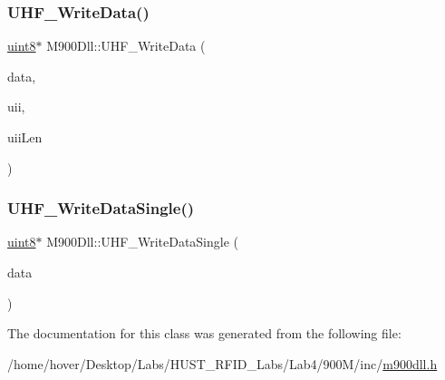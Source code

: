 \mbox{\label{class_m900_dll_adcb28ef71c880bcdca8fb0d17a1aa77e}} 
\subsubsection{\texorpdfstring{UHF\_WriteData()}{UHF\_WriteData()}}
{\footnotesize\ttfamily \mbox{\hyperlink{m900dll_8h_adde6aaee8457bee49c2a92621fe22b79}{uint8}}$\ast$ M900\+Dll\+::\+U\+H\+F\+\_\+\+Write\+Data (\begin{DoxyParamCaption}\item[{\mbox{\hyperlink{struct_u_h_f___req_write_data__t}{U\+H\+F\+\_\+\+Req\+Write\+Data\+\_\+t}} $\ast$}]{data,  }\item[{\mbox{\hyperlink{m900dll_8h_adde6aaee8457bee49c2a92621fe22b79}{uint8}} $\ast$}]{uii,  }\item[{\mbox{\hyperlink{m900dll_8h_adde6aaee8457bee49c2a92621fe22b79}{uint8}}}]{uii\+Len }\end{DoxyParamCaption})}

\mbox{\label{class_m900_dll_a72b323462a417a9c40bb0bf832ad7662}} 
\subsubsection{\texorpdfstring{UHF\_WriteDataSingle()}{UHF\_WriteDataSingle()}}
{\footnotesize\ttfamily \mbox{\hyperlink{m900dll_8h_adde6aaee8457bee49c2a92621fe22b79}{uint8}}$\ast$ M900\+Dll\+::\+U\+H\+F\+\_\+\+Write\+Data\+Single (\begin{DoxyParamCaption}\item[{\mbox{\hyperlink{struct_u_h_f___req_write_data__t}{U\+H\+F\+\_\+\+Req\+Write\+Data\+\_\+t}} $\ast$}]{data }\end{DoxyParamCaption})}



The documentation for this class was generated from the following file\+:\begin{DoxyCompactItemize}
\item 
/home/hover/\+Desktop/\+Labs/\+H\+U\+S\+T\+\_\+\+R\+F\+I\+D\+\_\+\+Labs/\+Lab4/900\+M/inc/\mbox{\hyperlink{m900dll_8h}{m900dll.\+h}}\end{DoxyCompactItemize}
